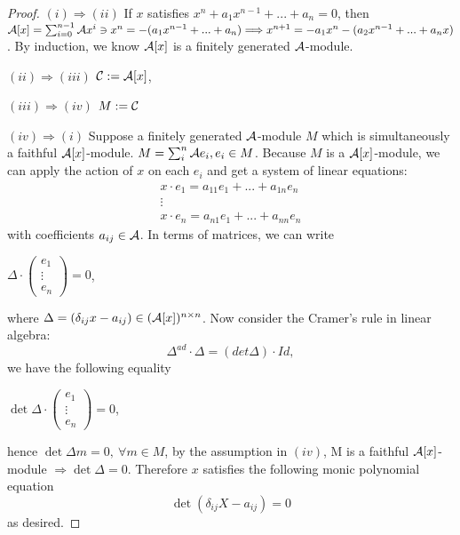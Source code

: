 \documentclass[11pt]{article}
\newcommand{\cala}{{\cal A}}
\newcommand{\calc}{{\cal C}}
\newcommand{\Lrta}{\Longrightarrow}
\begin{document}
\begin{proof}
$(i)\Lrta(ii)$ If $x$ satisfies $x^n+a_1 x^{n-1}+...+a_n=0$, then $\cala[x]=\sum^{n-1}_{i=0}\cala x^i\ni x^n=-(a_1 x^{n-1}+...+a_n)\Lrta x^{n+1}=-a_1x^n-(a_2 x^{n-1}+...+a_n x)$. By induction, we know $\cala[x]$ is a finitely generated $\cala$-module.

$(ii)\Lrta (iii)$ $\calc:=\cala[x]$,

$(iii)\Lrta(iv)$ $M:=\calc$

$(iv)\Lrta(i)$ Suppose a finitely generated $\cala$-module $M$ which is simultaneously a faithful $\cala[x]$-module. $M=\sum_i^n\cala e_i, e_i\in M$. Because $M$ is a $\cala[x]$-module, we can apply the action of $x$ on each $e_i$ and get a system of linear equations:
$$
\begin{array}{ c }
x\cdot e_{1} =a_{11} e_{1} +...+a_{1n} e_{n}\\
\vdots \\
x\cdot e_{n} =a_{n1} e_{1} +...+a_{nn} e_{n}
\end{array}
$$
with coefficients $a_{ij}\in\cala$. In terms of matrices, we can write
\begin{center}
$\Delta \cdot \begin{pmatrix}
e_{1}\\
\vdots \\
e_{n}
\end{pmatrix} =0$,
\end{center}
where $\Delta=(\delta_{ij}x-a_{ij})\in (\cala[x])^{n\times n}$. Now consider the Cramer's rule in linear algebra:
$$
\Delta^{ad}\cdot \Delta=(det\Delta)\cdot Id,
$$
we have the following equality
\begin{center}
$\det \Delta \cdot \begin{pmatrix}
e_{1}\\
\vdots \\
e_{n}
\end{pmatrix} =0$,
\end{center}
hence $\det\Delta m=0,\ \forall m\in M$, by the assumption in $(iv)$, M is a faithful $\cala[x]$-module $\Lrta \det \Delta=0$. Therefore $x$ satisfies the following monic polynomial equation 
$$
\det (\delta_{ij} X-a_{ij})=0
$$
as desired.

\end{proof}
\end{document}
